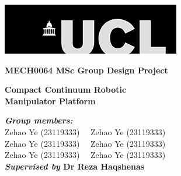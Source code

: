 \documentclass[12pt]{report} %
\begin{document}
\begin{titlepage}
\begin{center}
        \begin{center}
        \includegraphics[width=.70\textwidth]{Image/ucl_logo.png}
        \vspace{0.5cm}
        \end{center}
        \vspace*{0.1cm}
        \vspace{2cm}
        {\LARGE\textbf{MECH0064 MSc Group Design Project\\}}

        \vspace{2cm}
        {\Huge\textbf{Compact Continuum Robotic\\}}
        \vspace{0.25cm}
        {\Huge\textbf{Manipulator Platform\\}}

        \vfill

        \begin{flushleft}
        \textbf{\emph{Group members:}} \\
        Zehao Ye (23119333)~~ Zehao Ye (23119333)\\ 
        Zehao Ye (23119333)~~ Zehao Ye (23119333)\\ 
        Zehao Ye (23119333)~~ Zehao Ye (23119333)\\ 
        \textbf{\emph{Supervised by} Dr Reza Haqshenas}
        \end{flushleft}
        \vspace{0.8cm}
\end{center}
\end{titlepage}



\tableofcontents
{}
\newpage 


\listoffigures
{}
\newpage
\end{document}
